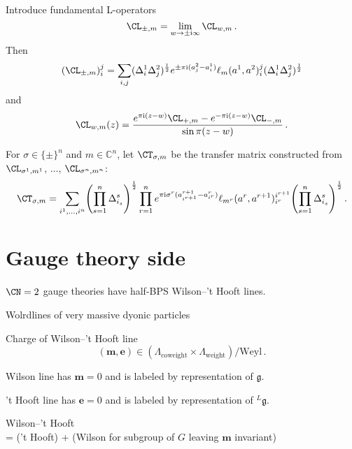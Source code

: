 \documentclass[t]{beamer}
\newcommand{\gf}{\mathfrak{g}}
\newcommand{\C}{\mathbb{C}}
\newcommand{\iu}{\mathrm{i}}
\newcommand{\mcharge}{\mathbf{m}}
\newcommand{\echarge}{\mathbf{e}}
\begin{document}
\begin{frame}
  Introduce \alert{fundamental L-operators}
  \begin{equation*}
    \CL_{\pm,m} = \lim_{w \to \pm\iu\infty} \CL_{w,m} \,.
  \end{equation*}
  Then
  \begin{equation*}
    (\CL_{\pm,m})_i^j
    =
    \sum_{i,j}
    (\Delta^1_i \Delta^2_j)^{\frac12}
    e^{\pm\pi\iu(a^2_j - a^1_i)}
    \ell_m(a^1, a^2)_i^j
    (\Delta^1_i \Delta^2_j)^{\frac12}
  \end{equation*}
  and
  \begin{equation*}
    \CL_{w,m}(z)
    =
    \frac{e^{\pi\iu(z-w)} \CL_{+,m} - e^{-\pi\iu(z-w)} \CL_{-,m}}{\sin\pi(z-w)}
    \,.
  \end{equation*}
  
  For $\sigma \in \{\pm\}^n$ and $m \in \C^n$, let $\CT_{\sigma,m}$ be
  the transfer matrix constructed from $\CL_{\sigma^1,m^1}$, $\dotsc$,
  $\CL_{\sigma^n,m^n}$:
  \begin{equation*}
    \CT_{\sigma,m}
    =
    \sum_{i^1, \dotsc, i^n}
    \Biggl(\prod_{s=1}^n \Delta^s_{i_s}\Biggr)^{\frac12}
    \prod_{r=1}^n
    e^{\pi\iu\sigma^r (a^{r+1}_{i^{r+1}} - a^r_{i^r})}
    \ell_{m^r}(a^r, a^{r+1})_{i^r}^{i^{r+1}}
    \Biggl(\prod_{s=1}^n \Delta^s_{i_s}\Biggr)^{\frac12}
    \,.
  \end{equation*}
\end{frame}


\section*{Gauge theory side}

\begin{frame}
  $\CN = 2$ gauge theories have half-BPS \alert{Wilson--'t Hooft lines}.

  Wolrdlines of very massive dyonic particles

  Charge of Wilson--'t Hooft line
  \begin{equation*}
    (\mcharge, \echarge)
    \in (\Lambda_{\text{coweight}} \times \Lambda_{\text{weight}})/\mathrm{Weyl} \,.
  \end{equation*}

  Wilson line has $\mcharge = 0$ and is labeled by representation of $\gf$.

  't Hooft line has $\echarge = 0$ and is labeled by representation of ${}^L\gf$.

  Wilson--'t Hooft \\
  = ('t Hooft) + (Wilson for subgroup of $G$ leaving $\mcharge$ invariant)
\end{frame}
\end{document}
